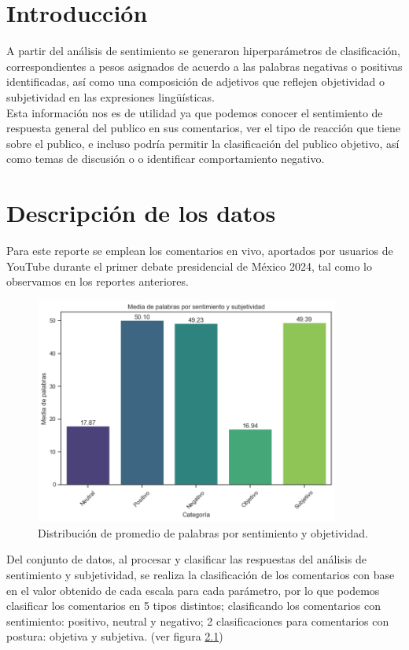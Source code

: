 \chapter{Introducción}

A partir del análisis de sentimiento se generaron hiperparámetros de clasificación, correspondientes a pesos asignados de acuerdo a las palabras negativas o positivas identificadas, así como una composición de adjetivos que reflejen objetividad o subjetividad en las expresiones lingüísticas.\\

Esta información nos es de utilidad ya que podemos conocer el sentimiento de respuesta general del publico en sus comentarios, ver el tipo de reacción que tiene sobre el publico, e incluso podría permitir la clasificación del publico objetivo, así como temas de discusión o o identificar comportamiento negativo.\\

\chapter{Descripción de los datos}

Para este reporte se emplean los comentarios en vivo, aportados por usuarios de YouTube durante el primer debate presidencial de México 2024, tal como lo observamos en los reportes anteriores.

\begin{figure}[!h]
	\centering
	\includegraphics[width=10cm]{Images/Promedio_de_palabras}
	\caption{Distribución de promedio de palabras por sentimiento y objetividad.}
	\label{fig:promediodepalabras}
\end{figure}

Del conjunto de datos, al procesar y clasificar las respuestas del análisis de sentimiento y subjetividad, se realiza la clasificación de los comentarios con base en el valor obtenido de cada escala para cada parámetro, por lo que podemos clasificar los comentarios en 5 tipos distintos; clasificando los comentarios con sentimiento: positivo, neutral y negativo; 2 clasificaciones para comentarios con postura: objetiva y subjetiva. (ver figura \ref{fig:promediodepalabras})\\

